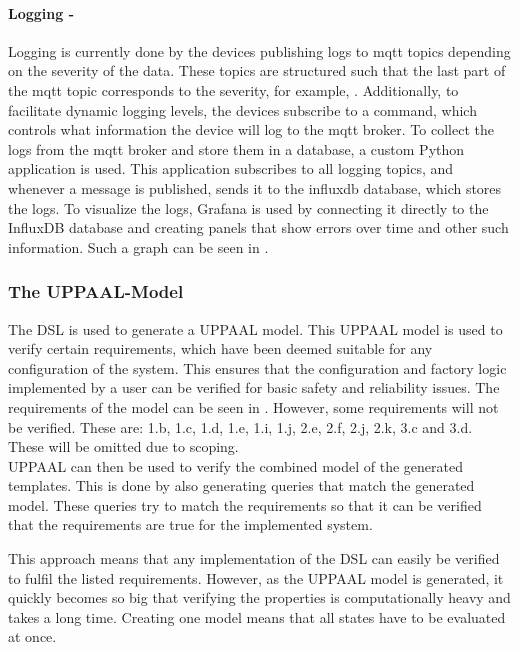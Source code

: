 \paragraph{Logging -}
Logging is currently done by the devices publishing logs to \acrshort{mqtt} topics depending on the severity of the data. These topics are structured such that the last part of the \acrshort{mqtt} topic corresponds to the severity, for example, . Additionally, to facilitate dynamic logging levels, the devices subscribe to a  command, which controls what information the device will log to the \acrshort{mqtt} broker.
To collect the logs from the \acrshort{mqtt} broker and store them in a database, a custom Python application is used. This application subscribes to all logging topics, and whenever a message is published, sends it to the influxdb database, which stores the logs. To visualize the logs, Grafana is used by connecting it directly to the InfluxDB database and creating panels that show errors over time and other such information. Such a graph can be seen in .

\subsubsection{The UPPAAL-Model} \label{section:uppaal-model}
\hfill

The DSL is used to generate a UPPAAL model. This UPPAAL model is used to verify certain requirements, which have been deemed suitable for any configuration of the system. This ensures that the configuration and factory logic implemented by a user can be verified for basic safety and reliability issues. The requirements of the model can be seen in . However, some requirements will not be verified. These are: 1.b, 1.c, 1.d, 1.e, 1.i, 1.j, 2.e, 2.f, 2.j, 2.k, 3.c and 3.d. These will be omitted due to scoping. \\

UPPAAL can then be used to verify the combined model of the generated templates. This is done by also generating queries that match the generated model. These queries try to match the requirements so that it can be verified that the requirements are true for the implemented system.

This approach means that any implementation of the DSL can easily be verified to fulfil the listed requirements. However, as the UPPAAL model is generated, it quickly becomes so big that verifying the properties is computationally heavy and takes a long time. Creating one model means that all states have to be evaluated at once.